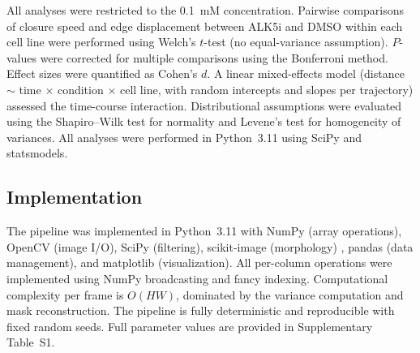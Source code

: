 All analyses were restricted to the 0.1~mM concentration. Pairwise comparisons of closure speed and edge displacement between ALK5i and DMSO within each cell line were performed using Welch's $t$-test (no equal-variance assumption). $P$-values were corrected for multiple comparisons using the Bonferroni method. Effect sizes were quantified as Cohen's $d$. A linear mixed-effects model (distance $\sim$ time $\times$ condition $\times$ cell line, with random intercepts and slopes per trajectory) assessed the time-course interaction. Distributional assumptions were evaluated using the Shapiro--Wilk test for normality and Levene's test for homogeneity of variances. All analyses were performed in Python~3.11 using SciPy and statsmodels.

\subsection{Implementation}

The pipeline was implemented in Python~3.11 with NumPy (array operations), OpenCV (image I/O), SciPy (filtering), scikit-image (morphology) \citep{vanderWalt2014}, pandas (data management), and matplotlib (visualization). All per-column operations were implemented using NumPy broadcasting and fancy indexing. Computational complexity per frame is $O(HW)$, dominated by the variance computation and mask reconstruction. The pipeline is fully deterministic and reproducible with fixed random seeds. Full parameter values are provided in Supplementary Table~S1.
